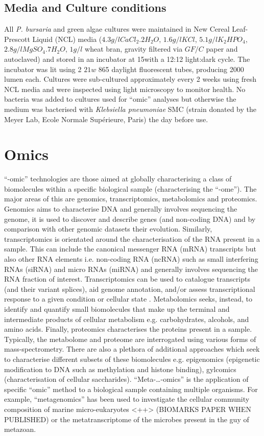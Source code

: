 \subsection{Media and Culture conditions}
All \textit{P. bursaria} and green algae cultures were maintained in 
New Cereal Leaf-Prescott Liquid (NCL) media 
(\(4.3g/l CaCl_{2}.2H_{2}O\), \(1.6g/l KCl\), \(5.1g/l K_{2}HPO_{4}\), \(2.8g/l MgSO_{4}.7H_{2}O\), 
\(1g/l\) wheat bran, gravity filtered via \(GF/C\) paper and autoclaved) \citep{NCLCCAP} and stored in 
an incubator at 15\celsius with a 12:12 light:dark cycle.  The incubator was
lit using 2 \(21w\) 865 daylight fluorescent tubes, producing 2000 lumen each.
Cultures were sub-cultured approximately every 2 weeks using fresh NCL media and were inspected using light microscopy to monitor health.  
No bacteria was added to cultures used for ``omic'' analyses but otherwise the medium was bacterised with
\textit{Klebsiella pneumoniae} SMC (strain donated by the Meyer Lab, Ecole Normale Supérieure, Paris) the day before use. 


\section{Omics}
``-omic'' technologies are those aimed at globally characterising a class of biomolecules 
within a specific biological sample (characterising the ``-ome''). The major areas of this
are genomics, transcriptomics, metabolomics and proteomics. 
Genomics aims to characterise DNA and generally involves sequencing the genome, it is used
to discover and describe genes (and non-coding DNA) and by comparison with other genomic
datasets their evolution.  Similarly, transcriptomics is orientated 
around the characterisation of the RNA present in a sample.  This can include
the canonical messenger RNA (mRNA) transcripts but also other RNA elements i.e.
non-coding RNA (ncRNA) such as small interfering RNAs (siRNA) and micro RNAs (miRNA) and
generally involves sequencing the RNA fraction of interest.
Transcriptomics can be used to catalogue transcripts (and their variant splices), 
aid genome annotation,  and/or assess transcriptional response to a given condition or cellular state \citep{Wang2009}.
Metabolomics seeks, instead, to identify and quantify small biomolecules that make up the terminal and
intermediate products of cellular metabolism e.g. carbohydrates, alcohols, and amino acids.  
Finally, proteomics characterises the proteins present in a sample. 
Typically, the metabolome and proteome are interrogated using various forms of mass-spectrometry.
There are also a plethora of additional approaches which seek to characterise
different subsets of these biomolecules e.g. epigenomics (epigenetic modification to DNA such as methylation
and histone binding), gylcomics (characterisation of cellular saccharides).
``Meta-\ldots-omics'' is the application of specific ``omic'' method to a biological sample 
containing multiple organisms. For example, ``metagenomics'' has been used to investigate
the cellular community composition of marine micro-eukaryotes \citep{}<++> (BIOMARKS PAPER WHEN PUBLISHED) %
or the metatranscriptome of the microbes present in the guy of metazoan.


